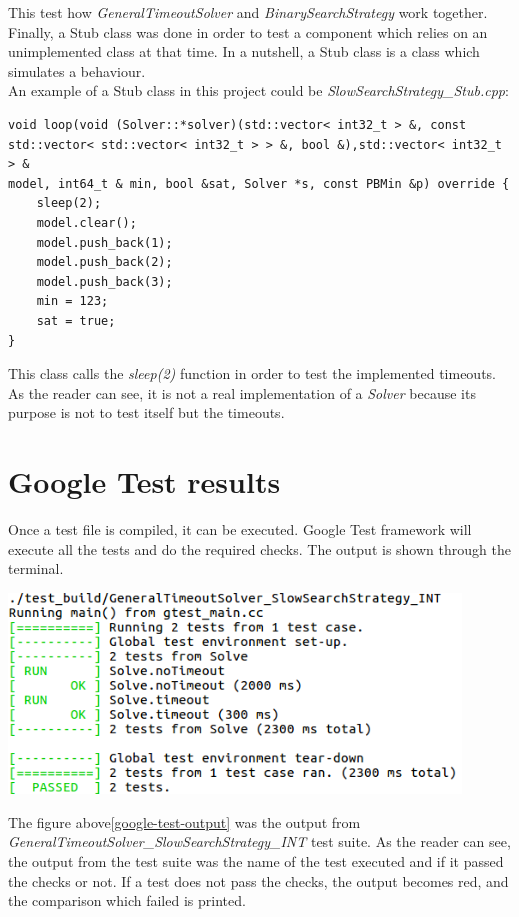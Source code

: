 This test how \emph{GeneralTimeoutSolver} and \emph{BinarySearchStrategy} work together.\\
Finally, a Stub class was done in order to test a component which relies on an unimplemented class at that time. In a nutshell, a Stub class is a class which simulates a behaviour. \\
An example of a Stub class in this project could be \emph{SlowSearchStrategy\_Stub.cpp}:
\begin{verbatim}
void loop(void (Solver::*solver)(std::vector< int32_t > &, const
std::vector< std::vector< int32_t > > &, bool &),std::vector< int32_t > &
model, int64_t & min, bool &sat, Solver *s, const PBMin &p) override {
    sleep(2);
    model.clear();
    model.push_back(1);
    model.push_back(2);
    model.push_back(3);
    min = 123;
    sat = true;
}
\end{verbatim}
This class calls the \emph{sleep(2)} function in order to test the implemented timeouts. As the reader can see, it is not a real implementation of a \emph{Solver} because its purpose is not to test itself but the timeouts.

\section{Google Test results}
Once a test file is compiled, it can be executed. Google Test framework will execute all the tests and do the required checks. The output is shown through the terminal.
\begin{center}
	\includegraphics[width=0.9\textwidth]{Figures/google-test-output.png}
	\label{google-test-output}
\end{center}
The figure above\ref{google-test-output} was the output from \emph{GeneralTimeoutSolver\_SlowSearchStrategy\_INT} test suite. As the reader can see, the output from the test suite was the name of the test executed and if it passed the checks or not.  If a test does not pass the checks, the output becomes red, and the comparison which failed is printed. 